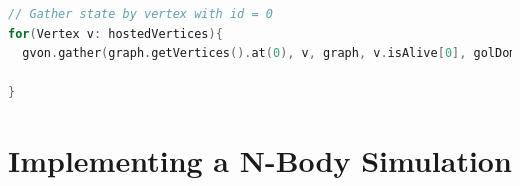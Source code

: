 \begin{lstlisting}[language=C++, label=lst:gol_gather, caption={\ } ]
// Gather state by vertex with id = 0
for(Vertex v: hostedVertices){
  gvon.gather(graph.getVertices().at(0), v, graph, v.isAlive[0], golDomain);

}
\end{lstlisting}


\section{Implementing a N-Body Simulation}

